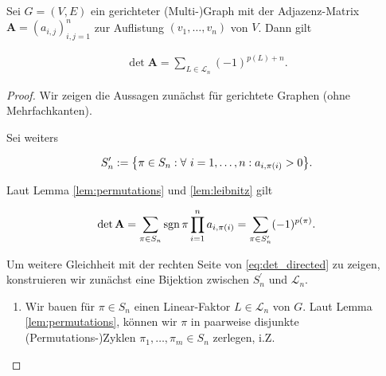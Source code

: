             \begin{theorem} \label{thm:det}

                Sei $G = (V, E)$ ein gerichteter (Multi-)Graph mit der Adjazenz-Matrix $\mathbf A = (a_{i,j})_{i,j=1}^n$ zur Auflistung $(v_1, \dots, v_n)$ von $V$.
                Dann gilt

                \begin{align} \label{eq:det_directed}
                    \det \mathbf A
                    =
                    \sum_{L \in \mathcal L_n}
                        (-1)^{p(L) + n}.
                \end{align}

            \end{theorem}

            \begin{proof}

                Wir zeigen die Aussagen zunächst für gerichtete Graphen (ohne Mehrfachkanten).

                Sei weiters

                \begin{align*}
                    S_n^\prime
                    :=
                    {\left \{ \pi \in S_n: \forall ~ i = 1, \dots, n: a_{i, \pi(i)} > 0 \right \}}.
                \end{align*}

                Laut Lemma \ref{lem:permutations} und \ref{lem:leibnitz} gilt

                \begin{align*}
                    \det \mathbf A
                    =
                    \sum_{\pi \in S_n}
                        \operatorname{sgn} \pi
                        \prod_{i=1}^n
                            a_{i, \pi(i)}
                    =
                    \sum_{\pi \in S_n^\prime}
                        (-1)^{p(\pi)}.
                \end{align*}

                Um weitere Gleichheit mit der rechten Seite von \ref{eq:det_directed} zu zeigen, konstruieren wir zunächst eine Bijektion zwischen $S_n^\prime$ und $\mathcal L_n$.

                \begin{enumerate}[label = \arabic*.]

                    \item Wir bauen für $\pi \in S_n$ einen Linear-Faktor $L \in \mathcal L_n$ von $G$.
                    Laut Lemma \ref{lem:permutations}, können wir $\pi$ in paarweise disjunkte (Permutations-)Zyklen $\pi_1, \dots, \pi_m \in S_n$ zerlegen, i.Z.


\end{enumerate}
\end{proof}
